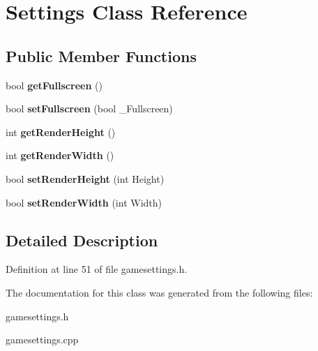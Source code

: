 \hypertarget{classSettings}{
\section{Settings Class Reference}
\label{df/d9a/classSettings}
}
\subsection*{Public Member Functions}
\begin{DoxyCompactItemize}
\item 
\hypertarget{classSettings_a9c2f80cb87b5b3e8f2da0b6056c2cad6}{
bool {\bfseries getFullscreen} ()}
\label{df/d9a/classSettings_a9c2f80cb87b5b3e8f2da0b6056c2cad6}

\item 
\hypertarget{classSettings_a7227367aa824b71d1366eddce9a94e3f}{
bool {\bfseries setFullscreen} (bool \_\-Fullscreen)}
\label{df/d9a/classSettings_a7227367aa824b71d1366eddce9a94e3f}

\item 
\hypertarget{classSettings_a0d620300e6eb872e6914cabad3035641}{
int {\bfseries getRenderHeight} ()}
\label{df/d9a/classSettings_a0d620300e6eb872e6914cabad3035641}

\item 
\hypertarget{classSettings_aea6ac481630cf986acf3853939c6bdf3}{
int {\bfseries getRenderWidth} ()}
\label{df/d9a/classSettings_aea6ac481630cf986acf3853939c6bdf3}

\item 
\hypertarget{classSettings_a0381303bcccf944c77b8f88dcb4ffa96}{
bool {\bfseries setRenderHeight} (int Height)}
\label{df/d9a/classSettings_a0381303bcccf944c77b8f88dcb4ffa96}

\item 
\hypertarget{classSettings_abb497fd25c4184054c1bb89a7e58b5d3}{
bool {\bfseries setRenderWidth} (int Width)}
\label{df/d9a/classSettings_abb497fd25c4184054c1bb89a7e58b5d3}

\end{DoxyCompactItemize}


\subsection{Detailed Description}


Definition at line 51 of file gamesettings.h.

The documentation for this class was generated from the following files:\begin{DoxyCompactItemize}
\item 
gamesettings.h\item 
gamesettings.cpp\end{DoxyCompactItemize}

